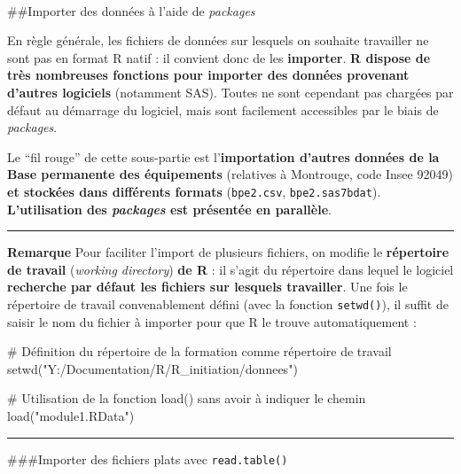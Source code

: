 \documentclass[12pt,twosided, notitlepage]{book}
\newenvironment{Shaded}{}{}
\newcommand{\CommentTok}[1]{\textcolor[rgb]{0.00,0.50,0.00}{#1}}
\newcommand{\KeywordTok}[1]{\textcolor[rgb]{0.00,0.00,1.00}{#1}}
\newcommand{\NormalTok}[1]{#1}
\newcommand{\StringTok}[1]{\textcolor[rgb]{0.00,0.50,0.50}{#1}}
\renewenvironment{Shaded}{\begin{snugshade}}{\end{snugshade}}
\begin{document}
~

\#\#Importer des données à l'aide de \emph{packages}

En règle générale, les fichiers de données sur lesquels on souhaite
travailler ne sont pas en format R natif : il convient donc de les
\textbf{importer}. \textbf{R dispose de très nombreuses fonctions pour
importer des données provenant d'autres logiciels} (notamment SAS).
Toutes ne sont cependant pas chargées par défaut au démarrage du
logiciel, mais sont facilement accessibles par le biais de
\emph{packages}.

Le \enquote{fil rouge} de cette sous-partie est l'\textbf{importation
d'autres données de la Base permanente des équipements} (relatives à
Montrouge, code Insee 92049) \textbf{et stockées dans différents
formats} (\texttt{bpe2.csv}, \texttt{bpe2.sas7bdat}).
\textbf{L'utilisation des \emph{packages} est présentée en parallèle}.

\begin{center}\rule{0.5\linewidth}{\linethickness}\end{center}

\textbf{Remarque} Pour faciliter l'import de plusieurs fichiers, on
modifie le \textbf{répertoire de travail} (\emph{working directory})
\textbf{de R} : il s'agit du répertoire dans lequel le logiciel
\textbf{recherche par défaut les fichiers sur lesquels travailler}. Une
fois le répertoire de travail convenablement défini (avec la fonction
\texttt{setwd()}), il suffit de saisir le
nom du fichier à importer pour que R le trouve automatiquement
:

\begin{Shaded}
\begin{Highlighting}[]
\CommentTok{# Définition du répertoire de la formation comme répertoire de travail}
\KeywordTok{setwd}\NormalTok{(}\StringTok{"Y:/Documentation/R/R_initiation/donnees"}\NormalTok{)}

\CommentTok{# Utilisation de la fonction load() sans avoir à indiquer le chemin}
\KeywordTok{load}\NormalTok{(}\StringTok{"module1.RData"}\NormalTok{)}
\end{Highlighting}
\end{Shaded}

\begin{center}\rule{0.5\linewidth}{\linethickness}\end{center}

\#\#\#Importer des fichiers plats avec \texttt{read.table()}
\end{document}
